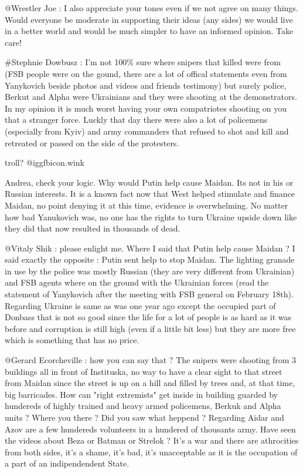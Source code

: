 \begin{itemize}
\begin{itemize}

@Wrestler Joe : I also appreciate your tones even if we not agree on many
things. Would everyone be moderate in supporting their ideas (any sides) we
would live in a better world and would be much simpler to have an informed
opinion. Take care!


\#Stephnie Dowbusz : I'm not 100\% sure where snipers that killed were from
(FSB people were on the gound, there are a lot of offical statements even from
Yanykovich beside photos and videos and friends testimony) but surely police,
Berkut and Alpha were Ukrainians and they were shooting at the demonstrators.
In my opinion it is much worst having your own compatriotes shooting on you
that a stranger force. Luckly that day there were also a lot of policemens
(especially from Kyiv) and army commanders that refused to shot and kill and
retreated or passed on the side of the protesters.


troll?  @igg{fbicon.wink} 


Andrea, check your logic. Why would Putin help cause Maidan. Its not in his or
Russian interests. It is a known fact now that West helped stimulate and
finance Maidan, no point denying it at this time, evidence is overwhelming. No
matter how bad Yanukovich was, no one has the rights to turn Ukraine upside
down like they did that now resulted in thousands of dead.



@Vitaly Shik : please enlight me. Where I said that Putin help cause Maidan ? I
said exactly the opposite : Putin sent help to stop Maidan. The lighting
granade in use by the police was mostly Russian (they are very different from
Ukrainian) and FSB agents where on the ground with the Ukrainian forces (read
the statement of Yanykovich after the meeting with FSB general on February
18th). Regarding Ukraine is same as was one year ago except the occupied part
of Donbass that is not so good since the life for a lot of people is as hard as
it was before and corruption is still high (even if a little bit less) but they
are more free which is something that has no price.


@Gerard Ecorcheville : how you can say that ? The snipers were shooting from 3
buildings all in front of Instituska, no way to have a clear sight to that
street from Maidan since the street is up on a hill and filled by trees and, at
that time, big barricades. How can "right extremists" get inside in building
guarded by hundereds of highly trained and heavy armed policemens, Berkuk and
Alpha units ? Where you there ? Did you saw what heppend ? Regarding Aidar and
Azov are a few hundereds volunteers in a hundered of thousants army. Have seen
the videos about Beza or Batman or Strelok ? It's a war and there are
athrocities from both sides, it's a shame, it's bad, it's unacceptable as it is
the occupation of a part of an indipendendent State.



\end{itemize}
\end{itemize}
